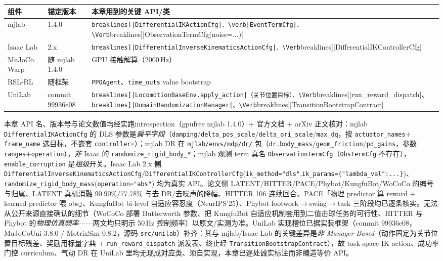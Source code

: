 \begin{center}
\small
\begin{tabularx}{\linewidth}{@{}llL@{}}
\toprule
组件 & 锚定版本 & 本章用到的关键 API/类 \\
\midrule
mjlab & 1.4.0 & \Verb[breaklines]|DifferentialIKActionCfg|、\verb|EventTermCfg|、\Verb[breaklines]|ObservationTermCfg(noise=...)| \\
Isaac Lab & 2.x & \Verb[breaklines]|DifferentialInverseKinematicsActionCfg|、\Verb[breaklines]|DifferentialIKControllerCfg| \\
MuJoCo Warp & 随 mjlab 1.4.0 & GPU 接触解算（2000\,Hz） \\
RSL-RL & 随框架 & \verb|PPOAgent|、\verb|time_outs| value bootstrap \\
UniLab & commit 99936e08 & \Verb[breaklines]|LocomotionBaseEnv.apply_action|（关节位置目标）、\Verb[breaklines]|run_reward_dispatch|、\Verb[breaklines]|DomainRandomizationManager|、\Verb[breaklines]|TransitionBootstrapContract| \\
\bottomrule
\end{tabularx}
\end{center}

\begin{finenote}
本章 API 名、版本号与论文数值均经实跑introspection（gpufree mjlab 1.4.0）+ 官方文档 + arXiv 正文核对：mjlab \texttt{DifferentialIKActionCfg} 的 DLS 参数是\emph{扁平字段}（\texttt{damping}/\allowbreak\texttt{delta\_pos\_scale}/\allowbreak\texttt{delta\_ori\_scale}/\allowbreak\texttt{max\_dq}，按 \texttt{actuator\_names}$+$\texttt{frame\_name} 选目标，不嵌套 \texttt{controller=}）；mjlab DR 在 \texttt{mjlab/\allowbreak envs/\allowbreak mdp/\allowbreak dr/\allowbreak } 包（\texttt{dr.\allowbreak body\_mass}/\allowbreak\texttt{geom\_friction}/\allowbreak\texttt{pd\_gains}，参数 \texttt{ranges}$+$\texttt{operation}），\emph{非} Isaac 的 \texttt{randomize\_rigid\_body\_*}；mjlab 观测 term 真名 \texttt{ObservationTermCfg}（\texttt{ObsTermCfg} 不存在），\texttt{enable\_corruption} 是\emph{组级}开关。Isaac Lab 2.x 侧 \texttt{DifferentialInverseKinematicsActionCfg}/\allowbreak\texttt{DifferentialIKControllerCfg}(\texttt{ik\_method="dls"},\texttt{ik\_params=\{"lambda\_val":...\}})、\texttt{randomize\_rigid\_body\_mass}(\texttt{operation="abs"}) 均为真实 API。论文侧 LATENT/HITTER/PACE/Phybot/KungfuBot/WoCoCo 的编号与归属、LATENT 真机消融 90.90\%/77.78\% 与去 DR/去噪声的降幅、HITTER 106 连续回合、PACE「物理 predictor 算 reward $+$ learned predictor 喂 obs」、KungfuBot bi-level 自适应容忍度（NeurIPS'25）、Phybot footwork$\to$swing$\to$task 三阶段均已逐条核实。无法从公开来源直接确认的细节（WoCoCo 部署 Butterworth 参数、把 KungfuBot 自适应机制套用到二值击球任务的可行性、HITTER 与 Phybot 的\emph{物理仿真频率}——两文均只明示 50\,Hz 控制频率）以原文/实测为准。UniLab 实现槽位已据实装框架（commit 99936e08，MuJoCoUni 3.8.0 / MotrixSim 0.8.2，源码 \texttt{src/unilab}）补齐：其与 mjlab/Isaac Lab 的关键差异是\emph{非 Manager-Based}（动作固定为关节位置目标残差、奖励用标量字典 $+$ \texttt{run\_reward\_dispatch} 派发表、终止经 \texttt{TransitionBootstrapContract}），故 task-space IK action、成功率门控 curriculum、气动 DR 在 UniLab 里均无现成对应类、须自实现，本章已逐处诚实标注而非编造等价 API。
\end{finenote}
